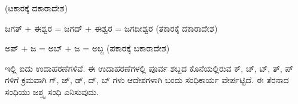 \indent (ಟಕಾರಕ್ಕೆ ದಕಾರಾದೇಶ)\par

\indent ಜಗತ್‌ + ಈಶ್ವರ = ಜಗದ್‌ + ಈಶ್ವರ = ಜಗದೀಶ್ವರ (ತಕಾರಕ್ಕೆ ದಕಾರಾದೇಶ)\par

\indent ಅಪ್‌ + ಜ = ಅಬ್‌ + ಜ = ಅಬ್ಜ (ಪಕಾರಕ್ಕೆ ಬಕಾರಾದೇಶ)\par

\indent ಇಲ್ಲಿ ಐದು ಉದಾಹರಣೆಗಳಿವೆ. ಈ ಉದಾಹರಣೆಗಳಲ್ಲಿ ಪೂರ್ವ ಶಬ್ದದ ಕೊನೆಯಲ್ಲಿರುವ ಕ್‌, ಚ್‌, ಟ್‌, ತ್‌, ಪ್‌ ಗಳಿಗೆ ಕ್ರಮವಾಗಿ ಗ್‌, ಜ್‌, ಡ್‌, ದ್‌, ಬ್‌ ಗಳು ಆದೇಶಗಳಾಗಿ ಬಂದು ಸಂಧಿಕಾರ್ಯ ವೇರ್ಪಟ್ಟಿದೆ. ಈ ತೆರನಾದ ಸಂಧಿಯು ಜಶ್ತ್ವ ಸಂಧಿ ಎನಿಸುವುದು.\par
